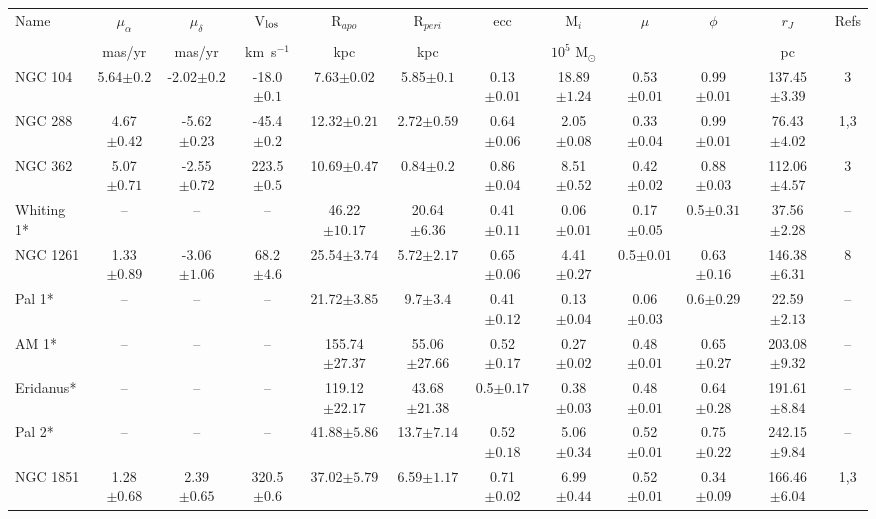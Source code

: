\begin{landscape}
\begin{table}
\footnotesize
\begin{tabular}{lccccccccccc}
\hline
Name & $\mu_{\alpha}$ & $\mu_{\delta}$ & V$_{\rm los}$ & R$_{apo}$ & R$_{peri}$ & ecc & M$_{i}$ & $\mu$ & $\phi$ & $r_J$ & Refs \\\\
 & mas/yr & mas/yr & km$\,$ s$^{-1}$ & kpc & kpc & & $10^5$ M$_{\odot}$ & & & pc & \\
\hline
\hline
NGC 104 & 5.64$\pm{0.2}$ & -2.02$\pm{0.2}$ & -18.0$\pm{0.1}$ & 7.63$\pm{0.02}$ & 5.85$\pm{0.1}$ & 0.13$\pm{0.01}$ & 18.89$\pm{1.24}$ & 0.53$\pm{0.01}$ & 0.99$\pm{0.01}$ & 137.45$\pm{3.39}$&3 \\ 
NGC 288 & 4.67$\pm{0.42}$ & -5.62$\pm{0.23}$ & -45.4$\pm{0.2}$ & 12.32$\pm{0.21}$ & 2.72$\pm{0.59}$ & 0.64$\pm{0.06}$ & 2.05$\pm{0.08}$ & 0.33$\pm{0.04}$ & 0.99$\pm{0.01}$ & 76.43$\pm{4.02}$&1,3 \\ 
NGC 362 & 5.07$\pm{0.71}$ & -2.55$\pm{0.72}$ & 223.5$\pm{0.5}$ & 10.69$\pm{0.47}$ & 0.84$\pm{0.2}$ & 0.86$\pm{0.04}$ & 8.51$\pm{0.52}$ & 0.42$\pm{0.02}$ & 0.88$\pm{0.03}$ & 112.06$\pm{4.57}$&3 \\ 
Whiting 1* & -- & -- & -- & 46.22$\pm{10.17}$ & 20.64$\pm{6.36}$ & 0.41$\pm{0.11}$ & 0.06$\pm{0.01}$ & 0.17$\pm{0.05}$ & 0.5$\pm{0.31}$ & 37.56$\pm{2.28}$&-- \\ 
NGC 1261 & 1.33$\pm{0.89}$ & -3.06$\pm{1.06}$ & 68.2$\pm{4.6}$ & 25.54$\pm{3.74}$ & 5.72$\pm{2.17}$ & 0.65$\pm{0.06}$ & 4.41$\pm{0.27}$ & 0.5$\pm{0.01}$ & 0.63$\pm{0.16}$ & 146.38$\pm{6.31}$&8 \\ 
Pal 1* & -- & -- & -- & 21.72$\pm{3.85}$ & 9.7$\pm{3.4}$ & 0.41$\pm{0.12}$ & 0.13$\pm{0.04}$ & 0.06$\pm{0.03}$ & 0.6$\pm{0.29}$ & 22.59$\pm{2.13}$&-- \\ 
AM 1* & -- & -- & -- & 155.74$\pm{27.37}$ & 55.06$\pm{27.66}$ & 0.52$\pm{0.17}$ & 0.27$\pm{0.02}$ & 0.48$\pm{0.01}$ & 0.65$\pm{0.27}$ & 203.08$\pm{9.32}$&-- \\ 
Eridanus* & -- & -- & -- & 119.12$\pm{22.17}$ & 43.68$\pm{21.38}$ & 0.5$\pm{0.17}$ & 0.38$\pm{0.03}$ & 0.48$\pm{0.01}$ & 0.64$\pm{0.28}$ & 191.61$\pm{8.84}$&-- \\ 
Pal 2* & -- & -- & -- & 41.88$\pm{5.86}$ & 13.7$\pm{7.14}$ & 0.52$\pm{0.18}$ & 5.06$\pm{0.34}$ & 0.52$\pm{0.01}$ & 0.75$\pm{0.22}$ & 242.15$\pm{9.84}$&-- \\ 
NGC 1851 & 1.28$\pm{0.68}$ & 2.39$\pm{0.65}$ & 320.5$\pm{0.6}$ & 37.02$\pm{5.79}$ & 6.59$\pm{1.17}$ & 0.71$\pm{0.02}$ & 6.99$\pm{0.44}$ & 0.52$\pm{0.01}$ & 0.34$\pm{0.09}$ & 166.46$\pm{6.04}$&1,3 \\ 

\end{tabular}
\end{table}
\end{landscape}
